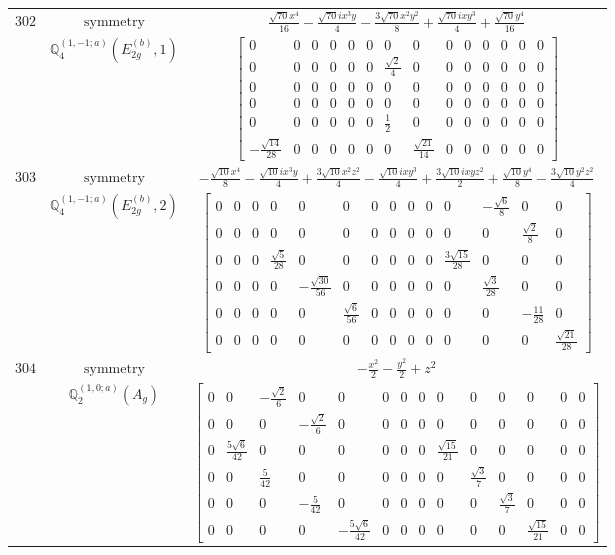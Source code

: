 \documentclass[fleqn,8pt,landscape]{jsarticle}
\begin{document}
\begin{longtable}{ccc}
$ 302 $ & $ \text{symmetry} $ & $ \frac{\sqrt{70} x^{4}}{16} - \frac{\sqrt{70} i x^{3} y}{4} - \frac{3 \sqrt{70} x^{2} y^{2}}{8} + \frac{\sqrt{70} i x y^{3}}{4} + \frac{\sqrt{70} y^{4}}{16} $ \\
$  $ & $ \mathbb{Q}_{4}^{(1,-1;a)}(E_{2g}^{(b)},1) $ & $ \begin{bmatrix} 0 & 0 & 0 & 0 & 0 & 0 & 0 & 0 & 0 & 0 & 0 & 0 & 0 & 0 \\ 0 & 0 & 0 & 0 & 0 & 0 & \frac{\sqrt{2}}{4} & 0 & 0 & 0 & 0 & 0 & 0 & 0 \\ 0 & 0 & 0 & 0 & 0 & 0 & 0 & 0 & 0 & 0 & 0 & 0 & 0 & 0 \\ 0 & 0 & 0 & 0 & 0 & 0 & 0 & 0 & 0 & 0 & 0 & 0 & 0 & 0 \\ 0 & 0 & 0 & 0 & 0 & 0 & \frac{1}{2} & 0 & 0 & 0 & 0 & 0 & 0 & 0 \\ - \frac{\sqrt{14}}{28} & 0 & 0 & 0 & 0 & 0 & 0 & \frac{\sqrt{21}}{14} & 0 & 0 & 0 & 0 & 0 & 0 \end{bmatrix} $ \\ \hline
$ 303 $ & $ \text{symmetry} $ & $ - \frac{\sqrt{10} x^{4}}{8} - \frac{\sqrt{10} i x^{3} y}{4} + \frac{3 \sqrt{10} x^{2} z^{2}}{4} - \frac{\sqrt{10} i x y^{3}}{4} + \frac{3 \sqrt{10} i x y z^{2}}{2} + \frac{\sqrt{10} y^{4}}{8} - \frac{3 \sqrt{10} y^{2} z^{2}}{4} $ \\
$  $ & $ \mathbb{Q}_{4}^{(1,-1;a)}(E_{2g}^{(b)},2) $ & $ \begin{bmatrix} 0 & 0 & 0 & 0 & 0 & 0 & 0 & 0 & 0 & 0 & 0 & - \frac{\sqrt{6}}{8} & 0 & 0 \\ 0 & 0 & 0 & 0 & 0 & 0 & 0 & 0 & 0 & 0 & 0 & 0 & \frac{\sqrt{2}}{8} & 0 \\ 0 & 0 & 0 & \frac{\sqrt{5}}{28} & 0 & 0 & 0 & 0 & 0 & 0 & \frac{3 \sqrt{15}}{28} & 0 & 0 & 0 \\ 0 & 0 & 0 & 0 & - \frac{\sqrt{30}}{56} & 0 & 0 & 0 & 0 & 0 & 0 & \frac{\sqrt{3}}{28} & 0 & 0 \\ 0 & 0 & 0 & 0 & 0 & \frac{\sqrt{6}}{56} & 0 & 0 & 0 & 0 & 0 & 0 & - \frac{11}{28} & 0 \\ 0 & 0 & 0 & 0 & 0 & 0 & 0 & 0 & 0 & 0 & 0 & 0 & 0 & \frac{\sqrt{21}}{28} \end{bmatrix} $ \\ \hline
$ 304 $ & $ \text{symmetry} $ & $ - \frac{x^{2}}{2} - \frac{y^{2}}{2} + z^{2} $ \\
$  $ & $ \mathbb{Q}_{2}^{(1,0;a)}(A_{g}) $ & $ \begin{bmatrix} 0 & 0 & - \frac{\sqrt{2}}{6} & 0 & 0 & 0 & 0 & 0 & 0 & 0 & 0 & 0 & 0 & 0 \\ 0 & 0 & 0 & - \frac{\sqrt{2}}{6} & 0 & 0 & 0 & 0 & 0 & 0 & 0 & 0 & 0 & 0 \\ 0 & \frac{5 \sqrt{6}}{42} & 0 & 0 & 0 & 0 & 0 & 0 & \frac{\sqrt{15}}{21} & 0 & 0 & 0 & 0 & 0 \\ 0 & 0 & \frac{5}{42} & 0 & 0 & 0 & 0 & 0 & 0 & \frac{\sqrt{3}}{7} & 0 & 0 & 0 & 0 \\ 0 & 0 & 0 & - \frac{5}{42} & 0 & 0 & 0 & 0 & 0 & 0 & \frac{\sqrt{3}}{7} & 0 & 0 & 0 \\ 0 & 0 & 0 & 0 & - \frac{5 \sqrt{6}}{42} & 0 & 0 & 0 & 0 & 0 & 0 & \frac{\sqrt{15}}{21} & 0 & 0 \end{bmatrix} $ \\ \hline

\end{longtable}
\end{document}
